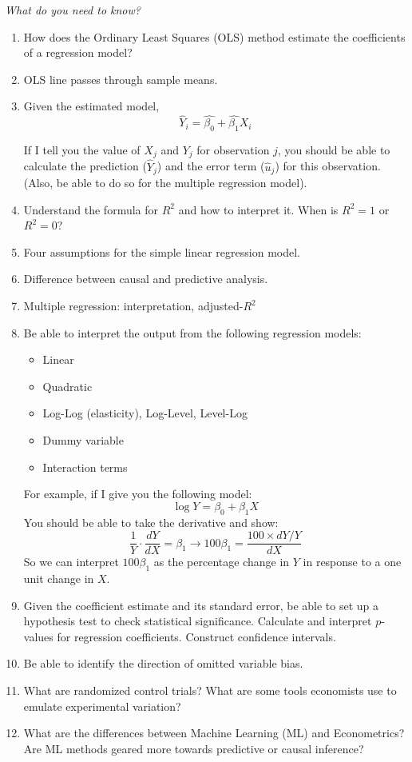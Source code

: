\documentclass{./../../Latex/handout}
\begin{document}
 \textit{What do you need to know?}
\begin{enumerate}
\item How does the Ordinary Least Squares (OLS) method estimate the coefficients of a regression model? 
\item OLS line passes through sample means. 
\item Given the estimated model, 
$$ \hat{Y}_i = \hat{\beta_0} + \hat{\beta_1} X_i $$

If I tell you the value of $X_j$ and $Y_j$ for observation $j$, you should be able to calculate the prediction ($\hat{Y}_j$) and the error term ($\hat{u}_j$) for this observation. (Also, be able to do so for the multiple regression model).
\item Understand the formula for $R^2$ and how to interpret it. When is $R^2=1$ or $R^2=0$? 
\item Four assumptions for the simple linear regression model. 
\item Difference between causal and predictive analysis. 
\item Multiple regression: interpretation, adjusted-$R^2$
\item Be able to interpret the output from the following regression models:
\begin{itemize}
  \item Linear
  \item Quadratic
  \item Log-Log (elasticity), Log-Level, Level-Log
  \item Dummy variable 
  \item Interaction terms
\end{itemize}
For example, if I give you the following model:
$$ \log Y = \beta_0 + \beta_1 X $$
You should be able to take the derivative and show:
$$ \frac{1}{Y} \cdot \frac{dY}{dX} = \beta_1 \rightarrow 100 \beta_1 = \frac{100 \times dY/Y}{dX}  $$
So we can interpret $100 \beta_1 $ as the percentage change in $Y$ in response to a one unit change in $X$.
\item Given the coefficient estimate and its standard error, be able to set up a hypothesis test to check statistical significance. Calculate and interpret $p$-values for regression coefficients. Construct confidence intervals. 
\item Be able to identify the direction of omitted variable bias. 
\item What are randomized control trials? What are some tools economists use to emulate experimental variation?
\item What are the differences between Machine Learning (ML) and Econometrics? Are ML methods geared more towards predictive or causal inference?
\end{enumerate}
\end{document}
